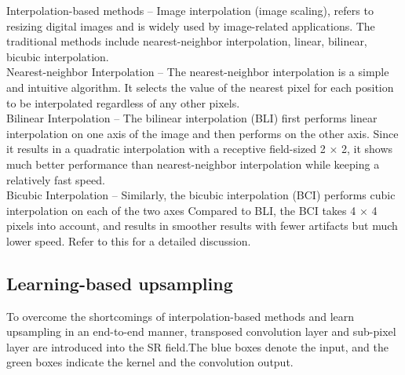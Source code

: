 Interpolation-based methods – Image interpolation (image scaling), refers to resizing digital images and is widely used by image-related applications. The traditional methods include nearest-neighbor interpolation, linear, bilinear, bicubic interpolation.\\

Nearest-neighbor Interpolation – The nearest-neighbor interpolation is a simple and intuitive algorithm. It selects the value of the nearest pixel for each position to be interpolated regardless of any other pixels.\\

Bilinear Interpolation – The bilinear interpolation (BLI) first performs linear interpolation on one axis of the image and then performs on the other axis. Since it results in a quadratic interpolation with a receptive field-sized 2 × 2, it shows much better performance than nearest-neighbor interpolation while keeping a relatively fast speed.\\

Bicubic Interpolation – Similarly, the bicubic interpolation (BCI) performs cubic interpolation on each of the two axes Compared to BLI, the BCI takes 4 × 4 pixels into account, and results in smoother results with fewer artifacts but much lower speed. Refer to this for a detailed discussion.\\

\subsection{Learning-based upsampling}
To overcome the shortcomings of interpolation-based methods and learn upsampling in an end-to-end manner, transposed convolution layer and sub-pixel layer are introduced into the SR field.The blue boxes denote the input, and the green boxes indicate the kernel and the convolution output.

